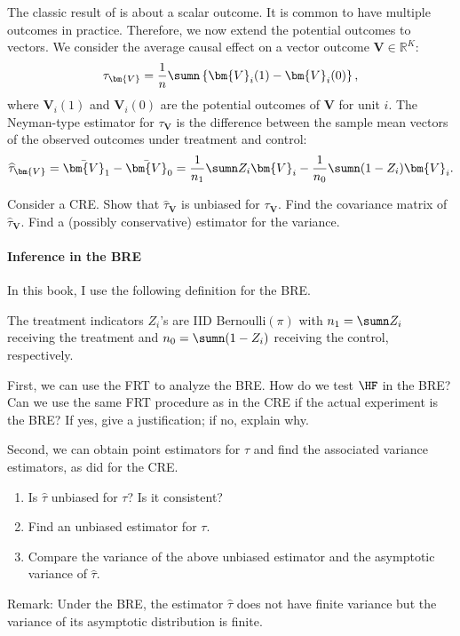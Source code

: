 The classic result of \citet{Neyman:1923} is about a scalar outcome. It is common to have multiple outcomes in practice. Therefore, we now extend the potential outcomes to vectors. We consider the average causal effect on a vector outcome $\bm{V}  \in \mathbb{R}^K$: 
$$
\tau_{\bm{V}} = \frac{1}{n}  \sumn \left\{  \bm{V}_i(1) - \bm{V}_i(0) \right\},
$$
where $\bm{V}_i(1)$ and $\bm{V}_i(0)$ are the potential outcomes of $\bm{V}$ for unit $i$. 
The Neyman-type estimator for $\tau_{\bm{V}}$ is the difference between the sample mean vectors of the observed outcomes under treatment and control:
$$
\widehat{ \tau}_{\bm{V}} = \bar{\bm{V}}_1  - \bar{\bm{V}}_0 
= \frac{1}{n_1}   \sumn Z_i  \bm{V}_i   - \frac{1}{n_0}  \sumn (1-Z_i) \bm{V}_i . 
$$


Consider a CRE. Show that $\widehat{ \tau}_{\bm{V}} $ is unbiased for $\tau_{\bm{V}} $. Find the covariance matrix of $\widehat{ \tau}_{\bm{V}} $. Find a (possibly conservative) estimator for the variance. 


\paragraph{Inference in the BRE}\label{hw::bre-inference}


In this book, I use the following definition for the BRE. 

\begin{definition}
[BRE]\label{def::BRE}
The treatment indicators $Z_i$'s are IID Bernoulli$(\pi)$ with $n_1 = \sumn Z_i$ receiving the treatment and $n_0 = \sumn (1-Z_i)$ receiving the control, respectively. 
\end{definition}



First, we can use the FRT to analyze the BRE. How do we test $\HF$ in the BRE? Can we use the same FRT procedure as in the CRE if the actual experiment is the BRE? If yes, give a justification; if no, explain why.

Second, we can obtain point estimators for $\tau$ and find the associated variance estimators, as \citet{Neyman:1923} did for the CRE. 
\begin{enumerate}
\item
Is $\hat{\tau}$ unbiased for $\tau$? Is it consistent?
\item
Find an unbiased estimator for $\tau$.
\item
Compare the variance of the above unbiased estimator and the asymptotic variance of $\hat{\tau}$. 
\end{enumerate}

Remark: 
Under the BRE, the estimator $\hat{\tau}$ does not have finite variance but the variance of its asymptotic distribution is finite. 



